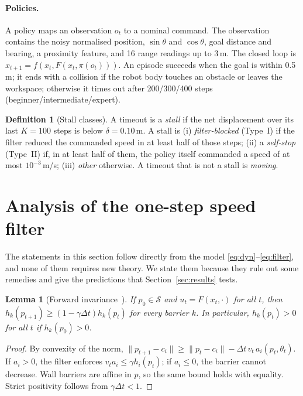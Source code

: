 \documentclass[11pt]{article}
\newtheorem{lemma}{Lemma}
\theoremstyle{definition}
\newtheorem{definition}{Definition}
\theoremstyle{remark}
\begin{document}
\paragraph{Policies.} A policy maps an observation $o_t$ to a nominal command. The observation contains the noisy normalised position, $\sin\theta$ and $\cos\theta$, goal distance and bearing, a proximity feature, and 16 range readings up to 3\,m. The closed loop is $x_{t+1}=f(x_t,F(x_t,\pi(o_t)))$. An episode succeeds when the goal is within 0.5\,m; it ends with a collision if the robot body touches an obstacle or leaves the workspace; otherwise it times out after 200/300/400 steps (beginner/intermediate/expert).

\begin{definition}[Stall classes]\label{def:stall}
A timeout is a \emph{stall} if the net displacement over its last $K=100$ steps is below $\delta=0.10$\,m. A stall is
(i) \emph{filter-blocked} (Type~I) if the filter reduced the commanded speed in at least half of those steps;
(ii) a \emph{self-stop} (Type~II) if, in at least half of them, the policy itself commanded a speed of at most $10^{-3}$\,m/s;
(iii) \emph{other} otherwise. A timeout that is not a stall is \emph{moving}.
\end{definition}

\section{Analysis of the one-step speed filter}\label{sec:theory}
The statements in this section follow directly from the model \eqref{eq:dyn}--\eqref{eq:filter}, and none of them requires new theory. We state them because they rule out some remedies and give the predictions that Section~\ref{sec:results} tests.

\begin{lemma}[Forward invariance~\cite{agrawal2017discrete}]\label{lem:inv}
If $p_0\in\mathcal S$ and $u_t=F(x_t,\cdot)$ for all $t$, then $h_k(p_{t+1})\ge(1-\gamma\Delta t)h_k(p_t)$ for every barrier $k$. In particular, $h_k(p_t)>0$ for all $t$ if $h_k(p_0)>0$.
\end{lemma}
\begin{proof}
By convexity of the norm, $\lVert p_{t+1}-c_i\rVert\ge\lVert p_t-c_i\rVert-\Delta t\,v_t\,a_i(p_t,\theta_t)$. If $a_i>0$, the filter enforces $v_t a_i\le\gamma h_i(p_t)$; if $a_i\le 0$, the barrier cannot decrease. Wall barriers are affine in $p$, so the same bound holds with equality. Strict positivity follows from $\gamma\Delta t<1$.
\end{proof}
\end{document}
